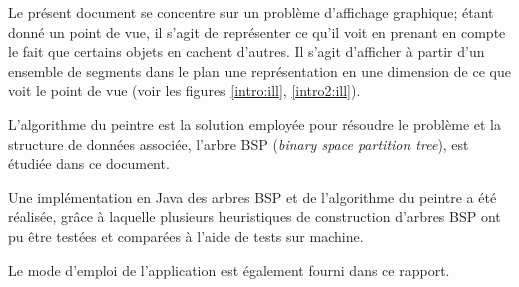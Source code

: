 Le présent document se concentre sur un problème d'affichage graphique;
étant donné un point de vue, il s'agit de représenter ce qu'il voit en
prenant en compte le fait que certains objets en cachent d'autres.
Il s'agit d'afficher à partir d'un ensemble de segments dans le
plan une représentation en une dimension de ce que voit le point de vue
(voir les figures
\ref{intro:ill}, \ref{intro2:ill}).

L'algorithme du peintre est la solution employée pour résoudre le problème et
la structure de données associée, l'arbre BSP
(\emph{binary space partition tree}), est étudiée dans ce document.

Une implémentation en Java des arbres BSP et de l'algorithme
du peintre a été réalisée, grâce à laquelle plusieurs
heuristiques de construction d'arbres BSP ont pu être testées et
comparées à l'aide de tests sur machine.

Le mode d'emploi de l'application est également fourni dans ce rapport.



